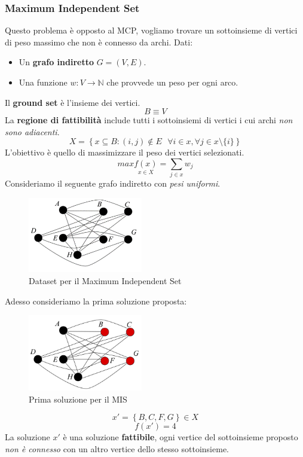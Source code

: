 \documentclass{article}
\begin{document}
\subsubsection{Maximum Independent Set}
Questo problema è opposto al MCP, vogliamo trovare un sottoinsieme di vertici di peso massimo che non è
connesso da archi.
Dati:
\begin{itemize}
    \item Un \textbf{grafo indiretto} $G=(V,E)$.
    \item Una funzione $w:V\rightarrow \mathbb{N}$ che provvede un peso per ogni arco.
\end{itemize}
Il \textbf{ground set} è l'insieme dei vertici.
$$B\equiv V$$
La \textbf{regione di fattibilità} include tutti i sottoinsiemi di vertici i cui archi \textit{non sono adiacenti}.
$$X=\left\{x\subseteq B : (i,j) \notin E \text{ }\forall i \in x, \forall j \in x\setminus \{i\}\right\}$$
L'obiettivo è quello di massimizzare il peso dei vertici selezionati.
$$max\underset{x\in X}{f(x)}=\sum_{j\in x}w_j$$
Consideriamo il seguente grafo indiretto con \textit{pesi uniformi}.
\begin{figure}[H]
    \centering
    \includegraphics[width=5cm]{images/MIS_dataset.png}
    \caption{Dataset per il Maximum Independent Set}
    \label{fig:MIS_dataset}
\end{figure}
Adesso consideriamo la prima soluzione proposta:
\begin{figure}[H]
    \centering
    \includegraphics[width=5cm]{images/MIS_sol1.png}
    \caption{Prima soluzione per il MIS}
    \label{fig:MIS_1}
\end{figure}

$$x'=\left\{B,C,F,G\right\}\in X$$
$$f(x')=4$$
La soluzione $x'$ è una soluzione \textbf{fattibile}, ogni vertice del sottoinsieme proposto \textit{non è connesso}
con un altro vertice dello stesso sottoinsieme.
\end{document}
